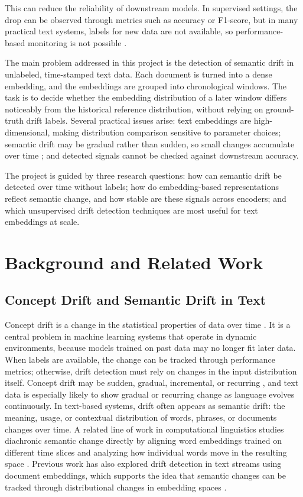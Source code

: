 \documentclass[conference]{IEEEtran}
\begin{document}
This can reduce the reliability of downstream models. In supervised settings, the drop can be observed through metrics such as accuracy or F1-score, but in many practical text systems, labels for new data are not available, so performance-based monitoring is not possible \cite{abghani2020}.

The main problem addressed in this project is the detection of semantic drift in unlabeled, time-stamped text data. Each document is turned into a dense embedding, and the embeddings are grouped into chronological windows. The task is to decide whether the embedding distribution of a later window differs noticeably from the historical reference distribution, without relying on ground-truth drift labels. Several practical issues arise: text embeddings are high-dimensional, making distribution comparison sensitive to parameter choices; semantic drift may be gradual rather than sudden, so small changes accumulate over time \cite{gama2014,lu2018}; and detected signals cannot be checked against downstream accuracy.

The project is guided by three research questions: how can semantic drift be detected over time without labels; how do embedding-based representations reflect semantic change, and how stable are these signals across encoders; and which unsupervised drift detection techniques are most useful for text embeddings at scale.

\section{Background and Related Work}
\label{sec:background}

\subsection{Concept Drift and Semantic Drift in Text}

Concept drift is a change in the statistical properties of data over time \cite{gama2014,lu2018}. It is a central problem in machine learning systems that operate in dynamic environments, because models trained on past data may no longer fit later data. When labels are available, the change can be tracked through performance metrics; otherwise, drift detection must rely on changes in the input distribution itself. Concept drift may be sudden, gradual, incremental, or recurring \cite{gama2014}, and text data is especially likely to show gradual or recurring change as language evolves continuously. In text-based systems, drift often appears as semantic drift: the meaning, usage, or contextual distribution of words, phrases, or documents changes over time. A related line of work in computational linguistics studies diachronic semantic change directly by aligning word embeddings trained on different time slices and analyzing how individual words move in the resulting space \cite{hamilton2016,kutuzov2018}. Previous work has also explored drift detection in text streams using document embeddings, which supports the idea that semantic changes can be tracked through distributional changes in embedding spaces \cite{hidalgo2019}.
\end{document}
